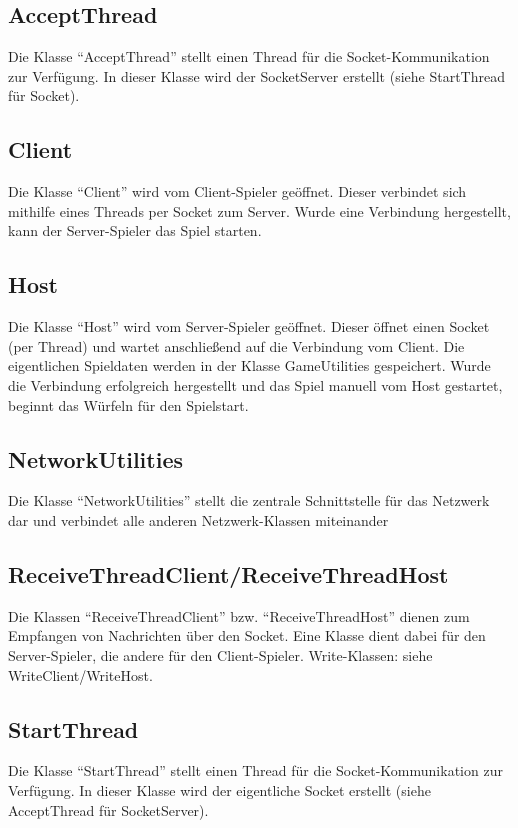 \documentclass[11pt]{article} %
\begin{document}
\subsection{AcceptThread}
Die Klasse \enquote{AcceptThread} stellt einen Thread für die Socket-Kommunikation zur Verfügung. In dieser Klasse wird der SocketServer erstellt (siehe StartThread für Socket).

\subsection{Client}
Die Klasse \enquote{Client} wird vom Client-Spieler geöffnet. Dieser verbindet sich mithilfe eines Threads per Socket zum Server. Wurde eine Verbindung hergestellt, kann der Server-Spieler das Spiel starten.

\subsection{Host}
Die Klasse \enquote{Host} wird vom Server-Spieler geöffnet. Dieser öffnet einen Socket (per Thread) und wartet anschließend auf die Verbindung vom Client. Die eigentlichen Spieldaten werden in der Klasse GameUtilities gespeichert.
Wurde die Verbindung erfolgreich hergestellt und das Spiel manuell vom Host gestartet, beginnt das Würfeln für den Spielstart.

\subsection{NetworkUtilities}
Die Klasse \enquote{NetworkUtilities} stellt die zentrale Schnittstelle für das Netzwerk dar und verbindet alle anderen Netzwerk-Klassen miteinander 

\subsection{ReceiveThreadClient/ReceiveThreadHost}
Die Klassen \enquote{ReceiveThreadClient} bzw. \enquote{ReceiveThreadHost} dienen zum Empfangen von Nachrichten über den Socket. Eine Klasse dient dabei für den Server-Spieler, die andere für den Client-Spieler. Write-Klassen: siehe WriteClient/WriteHost. 

\subsection{StartThread}
Die Klasse \enquote{StartThread} stellt einen Thread für die Socket-Kommunikation zur Verfügung. In dieser Klasse wird der eigentliche Socket erstellt (siehe AcceptThread für SocketServer).
\end{document}
